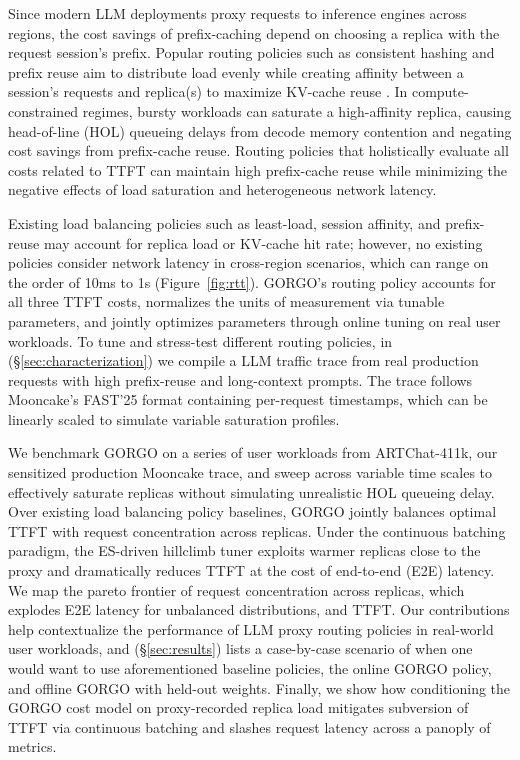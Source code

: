 \documentclass{article}
\begin{document}
Since modern LLM deployments proxy requests to inference engines across regions, the cost savings of prefix-caching depend on choosing a replica with the request session's prefix. Popular routing policies such as consistent hashing and prefix reuse aim to distribute load evenly while creating affinity between a session's requests and replica(s) to maximize KV-cache reuse \citep{karger1997consistent, chord2003, sglang2024, skywalker}. In compute-constrained regimes, bursty workloads can saturate a high-affinity replica, causing head-of-line (HOL) queueing delays from decode memory contention and negating cost savings from prefix-cache reuse. Routing policies that holistically evaluate all costs related to TTFT can maintain high prefix-cache reuse while minimizing the negative effects of load saturation and heterogeneous network latency.

Existing load balancing policies such as least-load, session affinity, and prefix-reuse may account for replica load or KV-cache hit rate; however, no existing policies consider network latency in cross-region scenarios, which can range on the order of 10ms to 1s (Figure~\ref{fig:rtt}). GORGO's routing policy accounts for all three TTFT costs, normalizes the units of measurement via tunable parameters, and jointly optimizes parameters through online tuning on real user workloads. To tune and stress-test different routing policies, in (\S\ref{sec:characterization}) we compile a LLM traffic trace from real production requests with high prefix-reuse and long-context prompts. The trace follows Mooncake's FAST'25 format \citep{qin2024mooncake} containing per-request timestamps, which can be linearly scaled to simulate variable saturation profiles.

We benchmark GORGO on a series of user workloads from ARTChat-411k, our sensitized production Mooncake trace, and sweep across variable time scales to effectively saturate replicas without simulating unrealistic HOL queueing delay. Over existing load balancing policy baselines, GORGO jointly balances optimal TTFT with request concentration across replicas. Under the continuous batching paradigm, the ES-driven hillclimb tuner exploits warmer replicas close to the proxy and dramatically reduces TTFT at the cost of end-to-end (E2E) latency. We map the pareto frontier of request concentration across replicas, which explodes E2E latency for unbalanced distributions, and TTFT. Our contributions help contextualize the performance of LLM proxy routing policies in real-world user workloads, and (\S\ref{sec:results}) lists a case-by-case scenario of when one would want to use aforementioned baseline policies, the online GORGO policy, and offline GORGO with held-out weights. Finally, we show how conditioning the GORGO cost model on proxy-recorded replica load mitigates subversion of TTFT via continuous batching and slashes request latency across a panoply of metrics.
\end{document}
